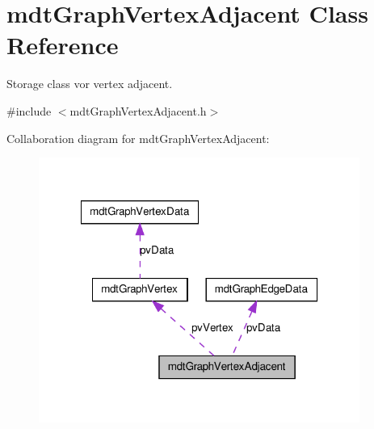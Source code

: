 \hypertarget{classmdt_graph_vertex_adjacent}{
\section{mdtGraphVertexAdjacent Class Reference}
\label{classmdt_graph_vertex_adjacent}
}


Storage class vor vertex adjacent.  




{\ttfamily \#include $<$mdtGraphVertexAdjacent.h$>$}



Collaboration diagram for mdtGraphVertexAdjacent:\nopagebreak
\begin{figure}[H]
\begin{center}
\leavevmode
\includegraphics[width=298pt]{classmdt_graph_vertex_adjacent__coll__graph}
\end{center}
\end{figure}
